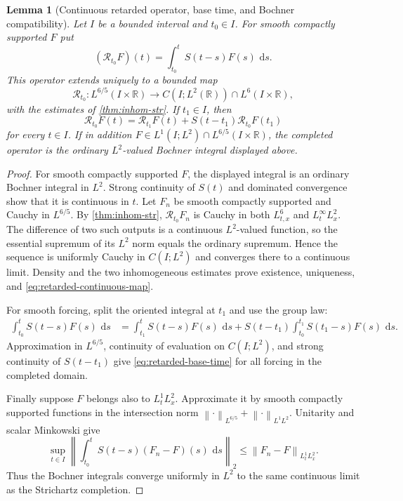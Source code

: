 \documentclass[11pt,oneside]{book}
\newtheorem{lemma}[theorem]{Lemma}
\theoremstyle{definition}
\theoremstyle{remark}
\newcommand{\R}{\mathbb R}
\newcommand{\1}{\mathbf 1}
\newcommand{\dd}{\,\mathrm d}
\newcommand{\norm}[1]{\left\lVert #1\right\rVert}
\begin{document}
\begin{lemma}[Continuous retarded operator, base time, and Bochner compatibility]
\label{lem:retarded-continuous}
Let $I$ be a bounded interval and $t_0\in I$.  For smooth compactly supported
$F$ put
\[
 (\mathcal R_{t_0}F)(t)=\int_{t_0}^tS(t-s)F(s)\,\dd s.
\]
This operator extends uniquely to a bounded map
\begin{equation}
 \mathcal R_{t_0}:L^{6/5}(I\times\R)
 \longrightarrow C(I;L^2(\R))\cap L^6(I\times\R),               \label{eq:retarded-continuous-map}
\end{equation}
with the estimates of \cref{thm:inhom-str}.  If $t_1\in I$, then
\begin{equation}
 \mathcal R_{t_0}F(t)
 =\mathcal R_{t_1}F(t)+S(t-t_1)\mathcal R_{t_0}F(t_1)             \label{eq:retarded-base-time}
\end{equation}
for every $t\in I$.  If in addition
$F\in L^1(I;L^2)\cap L^{6/5}(I\times\R)$, the completed operator is the
ordinary $L^2$-valued Bochner integral displayed above.
\end{lemma}

\begin{proof}
For smooth compactly supported $F$, the displayed integral is an ordinary
Bochner integral in $L^2$.  Strong continuity of $S(t)$ and dominated
convergence show that it is continuous in $t$.  Let $F_n$ be smooth compactly
supported and Cauchy in $L^{6/5}$.  By \cref{thm:inhom-str},
$\mathcal R_{t_0}F_n$ is Cauchy in both $L^6_{t,x}$ and
$L^\infty_tL^2_x$.  The difference of two such outputs is a continuous
$L^2$-valued function, so the essential supremum of its $L^2$ norm equals the
ordinary supremum.  Hence the sequence is uniformly Cauchy in
$C(I;L^2)$ and converges there to a continuous limit.  Density and the two
inhomogeneous estimates prove existence, uniqueness, and
\eqref{eq:retarded-continuous-map}.

For smooth forcing, split the oriented integral at $t_1$ and use the group
law:
\begin{align*}
 \int_{t_0}^tS(t-s)F(s)\,\dd s
 &=\int_{t_1}^tS(t-s)F(s)\,\dd s
   +S(t-t_1)\int_{t_0}^{t_1}S(t_1-s)F(s)\,\dd s.
\end{align*}
Approximation in $L^{6/5}$, continuity of evaluation on $C(I;L^2)$, and
strong continuity of $S(t-t_1)$ give \eqref{eq:retarded-base-time} for all
forcing in the completed domain.

Finally suppose $F$ belongs also to $L^1_tL^2_x$.  Approximate it by smooth
compactly supported functions in the intersection norm
$\norm\cdot_{L^{6/5}}+\norm\cdot_{L^1L^2}$.  Unitarity and scalar Minkowski
give
\[
 \sup_{t\in I}\left\|\int_{t_0}^tS(t-s)(F_n-F)(s)\,\dd s\right\|_2
 \le\norm{F_n-F}_{L^1_tL^2_x}.
\]
Thus the Bochner integrals converge uniformly in $L^2$ to the same continuous
limit as the Strichartz completion.
\end{proof}
\end{document}
